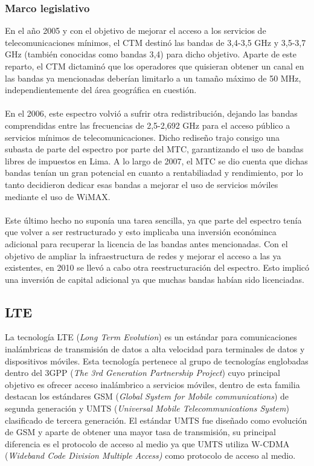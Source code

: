 \subsubsection{Marco legislativo}
En el año 2005 y con el objetivo de mejorar el acceso a los servicios de telecomunicaciones mínimos, el CTM destinó las bandas de 3,4-3,5 GHz y 3,5-3,7 GHz (también conocidas como bandas 3,4) para dicho objetivo. Aparte de este reparto, el CTM dictaminó que los operadores que quisieran obtener un canal en las bandas ya mencionadas deberían limitarlo a un tamaño máximo de 50 MHz, independientemente del área geográfica en cuestión.\\\\

En el 2006, este espectro volvió a sufrir otra redistribución, dejando las bandas comprendidas entre las frecuencias de 2,5-2,692 GHz para el acceso público a servicios mínimos de telecomunicaciones. Dicho rediseño trajo consigo una subasta de parte del espectro por parte del MTC, garantizando el uso de bandas libres de impuestos en Lima. A lo largo de 2007, el MTC se dio cuenta que dichas bandas tenían un gran potencial en cuanto a rentabiliadad y rendimiento, por lo tanto decidieron dedicar esas bandas a mejorar el uso de servicios móviles mediante el uso de WiMAX.\\\\

Este último hecho no suponía una tarea sencilla, ya que parte del espectro tenía que volver a ser restructurado y esto implicaba una inversión económinca adicional para recuperar la licencia de las bandas antes mencionadas. Con el objetivo de ampliar la infraestructura de redes y mejorar el acceso a las ya existentes, en 2010 se llevó a cabo otra reestructuración del espectro. Esto implicó una inversión de capital adicional ya que muchas bandas habían sido licenciadas.

\subsection{LTE}
La tecnología LTE (\textit{Long Term Evolution}) es un estándar para comunicaciones inalámbricas de transmisión de datos a alta velocidad para terminales de datos y dispositivos móviles. Esta tecnología pertenece al grupo de tecnologías englobadas dentro del 3GPP (\textit{The 3rd Generation Partnership Project}\cite{3gpp}) cuyo principal objetivo es ofrecer acceso inalámbrico a servicios móviles, dentro de esta familia destacan los estándares GSM (\textit{Global System for Mobile communications}) de segunda generación y UMTS (\textit{Universal Mobile Telecommunications System}) clasificado de tercera generación. El estándar UMTS fue diseñado como evolución de GSM y aparte de obtener una mayor tasa de transmisión, su principal diferencia es el protocolo de acceso al medio ya que UMTS utiliza W-CDMA (\textit{Wideband Code Division Multiple Access)} como protocolo de acceso al medio.\\

